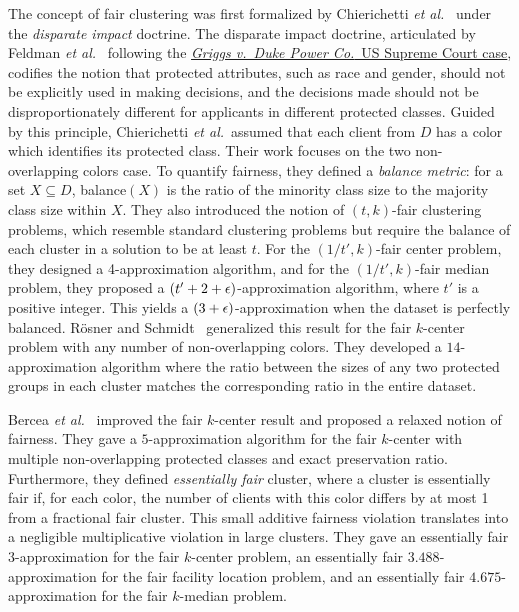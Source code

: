 \documentclass[12pt]{article}
\begin{document}
The concept of fair clustering was first formalized by Chierichetti \emph{et al.}~\cite{CKLV2018} under the \emph{disparate impact} doctrine. The disparate impact doctrine, articulated by Feldman \emph{et al.}~\cite{FSMSV2015} following the \href{https://en.wikipedia.org/wiki/Griggs_v._Duke_Power_Co.}{\emph{Griggs v.\ Duke Power Co.}\ US Supreme Court case}, codifies the notion that protected attributes, such as race and gender, should not be explicitly used in making decisions, and the decisions made should not be disproportionately different for applicants in different protected classes. 
Guided by this principle, Chierichetti \emph{et al.}~assumed that each client from $D$ has a color which identifies its protected class. 
Their work focuses on the two non-overlapping colors case. To quantify fairness, they defined a \emph{balance metric}: for a set $X \subseteq D$, balance$(X)$ is the ratio of the minority class size to the majority class size within $X$. 
They also introduced the notion of $(t,k)$-fair clustering problems, which resemble standard clustering problems but require the balance of each cluster in a solution to be at least $t$.
For the $(1/t',k)$-fair center problem, they designed a 4-approximation algorithm, and for the $(1/t',k)$-fair median problem, they proposed a $(t' + 2 + \epsilon)$-approximation algorithm, where $t'$ is a positive integer. 
This yields a $(3 + \epsilon)$-approximation when the dataset is perfectly balanced.
Rösner and Schmidt~\cite{RS2018} generalized this result for the fair $k$-center problem with any number of non-overlapping colors. 
They developed a $14$-approximation algorithm where the ratio between the sizes of any two protected groups in each cluster matches the corresponding ratio in the entire dataset.

Bercea \emph{et al.}~\cite{BGKKRSS2018} improved the fair $k$-center result and proposed a relaxed notion of fairness.
They gave a $5$-approximation algorithm for the fair $k$-center with multiple non-overlapping protected classes and exact preservation ratio. 
Furthermore, they defined \emph{essentially fair} cluster, where a cluster is essentially fair if, for each color, the number of clients with this color differs by at most 1 from a fractional fair cluster. 
This small additive fairness violation translates into a negligible multiplicative violation in large clusters. 
They gave an essentially fair $3$-approximation for the fair $k$-center problem, an essentially fair $3.488$-approximation for the fair facility location problem, and an essentially fair $4.675$-approximation for the fair $k$-median problem.
\end{document}

